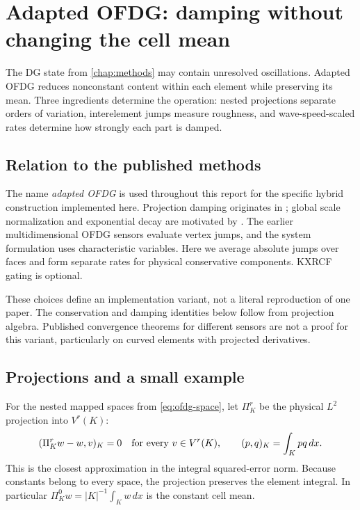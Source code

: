 \section{Adapted OFDG: damping without changing the cell mean}
\label{chap:ofdg}
The DG state from \cref{chap:methods} may contain unresolved oscillations.
Adapted OFDG reduces nonconstant content within each element while preserving
its mean. Three ingredients determine the operation: nested projections separate
orders of variation, interelement jumps measure roughness, and wave-speed-scaled
rates determine how strongly each part is damped.

\subsection{Relation to the published methods}
\label{sec:ofdg-relation-to-literature}
The name \emph{adapted OFDG} is used throughout this report for the specific
hybrid construction implemented here. Projection damping originates in
\cite{LuEtAl2021,LiuEtAl2022}; global scale normalization and exponential decay
are motivated by \cite{PengEtAl2024}. The earlier multidimensional OFDG
sensors evaluate vertex jumps, and the system formulation uses characteristic
variables. Here we average absolute jumps over faces and form separate rates
for physical conservative components. KXRCF gating is optional.

These choices define an implementation variant, not a literal reproduction of
one paper. The conservation and damping identities below follow from projection
algebra. Published convergence theorems for different sensors are not a proof
for this variant, particularly on curved elements with projected derivatives.

\subsection{Projections and a small example}
\label{sec:ofdg-mathematics}
For the nested mapped spaces from \cref{eq:ofdg-space}, let $\Pi_K^r$ be the
physical $L^2$ projection into $V^r(K)$:
\begin{equation}
 (\Pi_K^r w-w,v)_K=0\quad\hbox{for every }v\in V^r(K),
 \qquad (p,q)_K=\int_K pq\,dx.
 \label{eq:ofdg-l2-projection}
\end{equation}
This is the closest approximation in the integral squared-error norm.
Because constants belong to every space, the projection preserves the element
integral. In particular $\Pi_K^0w=|K|^{-1}\int_Kw\,dx$ is the constant cell mean.

